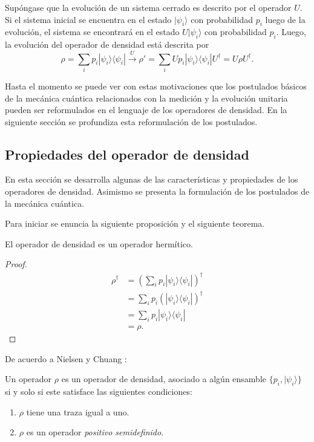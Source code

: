 Supóngase que la evolución de un sistema cerrado es descrito por el operador $U$. Si el sistema inicial se encuentra en el estado $|\psi_i\rangle$ con probabilidad $p_i$ luego de la evolución, el sistema se encontrará en el estado $U|\psi_i\rangle$ con probabilidad $p_i$. Luego, la evolución del operador de densidad está descrita por {\cite{nielsen_chuang_2010}}\[\rho=\sum_{i}p_i|\psi_i\rangle \langle \psi_i|\xrightarrow{U}\rho'=\sum_{i}Up_i|\psi_i\rangle \langle \psi_i|U^{\dagger}=U\rho U^{\dagger}.\]


Hasta el momento se puede ver con estas motivaciones que los postulados básicos de la mecánica cuántica relacionados con la medición y la evolución unitaria pueden ser reformulados en el lenguaje de los operadores de densidad. En la siguiente sección se profundiza esta reformulación de los postulados.


\subsection{Propiedades del operador de densidad}\label{postulates} %

En esta sección se desarrolla algunas de las características y propiedades de
los operadores de densidad. Asimismo se presenta la formulación de los
postulados de la mecánica cuántica. 

Para iniciar se enuncia la siguiente proposición y el siguiente teorema. 

\begin{proposition}El operador de densidad es un operador hermítico.
	
\end{proposition}


\begin{proof}
	\begin{equation}
		\begin{split}
			\rho^\dagger&={\left(\sum_{i} p_i|\psi_i\rangle \langle \psi_i|\right)}^{\dagger}\\
			&=\sum_{i} p_i {\left(|\psi_i\rangle \langle\psi_i|\right)}^{\dagger}\\
			&=\sum_{i} p_i |\psi_i\rangle \langle\psi_i|\\
			&=\rho.
		\end{split}
	\end{equation}
	
\end{proof}

De acuerdo a Nielsen y Chuang {\cite{nielsen_chuang_2010}}:\begin{theorem} Un operador $\rho$ es un operador de densidad, asociado a algún ensamble $\{p_i, |\psi_i\rangle\}$ si y solo si este satisface las siguientes condiciones:
\begin{enumerate}
	\item $\rho$ tiene una traza igual a uno.
	\item $\rho $ es un operador \textit{positivo semidefinido}.
\end{enumerate}	
\end{theorem}


